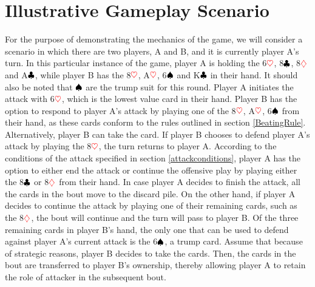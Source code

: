 \section{Illustrative Gameplay Scenario}
For the purpose of demonstrating the mechanics of the game, we will consider a scenario in which there are two players, A and B, and it is currently player A's turn. In this particular instance of the game, player A is holding the 6$\textcolor{red}{\heartsuit}$, 8$\textcolor{black}{\clubsuit}$, 8$\textcolor{red}{\diamondsuit}$ and A$\textcolor{black}{\clubsuit}$, while player B has the 8$\textcolor{red}{\heartsuit}$, A$\textcolor{red}{\heartsuit}$, 6$\textcolor{black}{\spadesuit}$ and K$\textcolor{black}{\clubsuit}$ in their hand. It should also be noted that $\textcolor{black}{\spadesuit}$ are the trump suit for this round. Player A initiates the attack with 6$\textcolor{red}{\heartsuit}$, which is the lowest value card in their hand. Player B has the option to respond to player A's attack by playing one of the 8$\textcolor{red}{\heartsuit}$, A$\textcolor{red}{\heartsuit}$, 6$\textcolor{black}{\spadesuit}$ from their hand, as these cards conform to the rules outlined in section \ref{BeatingRule}. Alternatively, player B can take the card. If player B chooses to defend player A's attack by playing the 8$\textcolor{red}{\heartsuit}$, the turn returns to player A. According to the conditions of the attack specified in section \ref{attackconditions}, player A has the option to either end the attack or continue the offensive play by playing either the 8$\textcolor{black}{\clubsuit}$ or 8$\textcolor{red}{\diamondsuit}$ from their hand. In case player A decides to finish the attack, all the cards in the bout move to the discard pile. On the other hand, if player A decides to continue the attack by playing one of their remaining cards, such as the 8$\textcolor{red}{\diamondsuit}$, the bout will continue and the turn will pass to player B. Of the three remaining cards in player B's hand, the only one that can be used to defend against player A's current attack is the 6$\textcolor{black}{\spadesuit}$, a trump card. Assume that because of strategic reasons, player B decides to take the cards. Then, the cards in the bout are transferred to player B's ownership, thereby allowing player A to retain the role of attacker in the subsequent bout.
